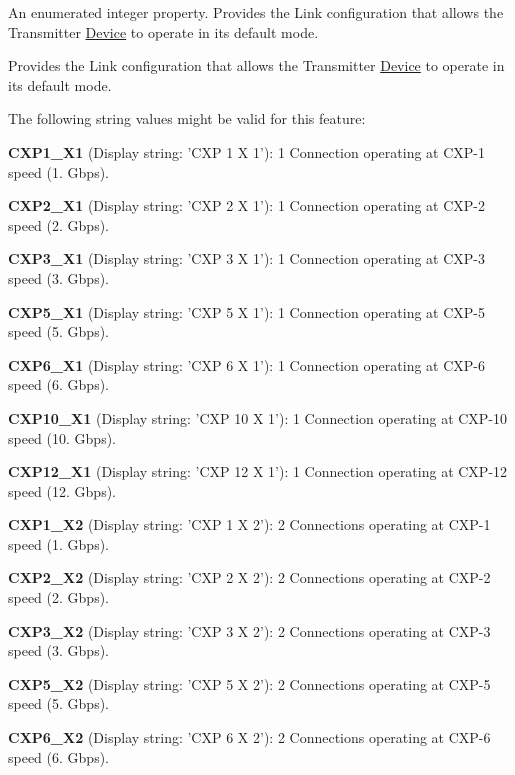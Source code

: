 An enumerated integer property. Provides the Link configuration that allows the Transmitter \hyperlink{classmv_i_m_p_a_c_t_1_1acquire_1_1_device}{Device} to operate in its default mode. 

Provides the Link configuration that allows the Transmitter \hyperlink{classmv_i_m_p_a_c_t_1_1acquire_1_1_device}{Device} to operate in its default mode.

The following string values might be valid for this feature\+:
\begin{DoxyItemize}
\item {\bfseries C\+X\+P1\+\_\+\+X1} (Display string\+: 'C\+X\+P 1 X 1')\+: 1 Connection operating at C\+X\+P-\/1 speed (1. Gbps).
\item {\bfseries C\+X\+P2\+\_\+\+X1} (Display string\+: 'C\+X\+P 2 X 1')\+: 1 Connection operating at C\+X\+P-\/2 speed (2. Gbps).
\item {\bfseries C\+X\+P3\+\_\+\+X1} (Display string\+: 'C\+X\+P 3 X 1')\+: 1 Connection operating at C\+X\+P-\/3 speed (3. Gbps).
\item {\bfseries C\+X\+P5\+\_\+\+X1} (Display string\+: 'C\+X\+P 5 X 1')\+: 1 Connection operating at C\+X\+P-\/5 speed (5. Gbps).
\item {\bfseries C\+X\+P6\+\_\+\+X1} (Display string\+: 'C\+X\+P 6 X 1')\+: 1 Connection operating at C\+X\+P-\/6 speed (6. Gbps).
\item {\bfseries C\+X\+P10\+\_\+\+X1} (Display string\+: 'C\+X\+P 10 X 1')\+: 1 Connection operating at C\+X\+P-\/10 speed (10. Gbps).
\item {\bfseries C\+X\+P12\+\_\+\+X1} (Display string\+: 'C\+X\+P 12 X 1')\+: 1 Connection operating at C\+X\+P-\/12 speed (12. Gbps).
\item {\bfseries C\+X\+P1\+\_\+\+X2} (Display string\+: 'C\+X\+P 1 X 2')\+: 2 Connections operating at C\+X\+P-\/1 speed (1. Gbps).
\item {\bfseries C\+X\+P2\+\_\+\+X2} (Display string\+: 'C\+X\+P 2 X 2')\+: 2 Connections operating at C\+X\+P-\/2 speed (2. Gbps).
\item {\bfseries C\+X\+P3\+\_\+\+X2} (Display string\+: 'C\+X\+P 3 X 2')\+: 2 Connections operating at C\+X\+P-\/3 speed (3. Gbps).
\item {\bfseries C\+X\+P5\+\_\+\+X2} (Display string\+: 'C\+X\+P 5 X 2')\+: 2 Connections operating at C\+X\+P-\/5 speed (5. Gbps).
\item {\bfseries C\+X\+P6\+\_\+\+X2} (Display string\+: 'C\+X\+P 6 X 2')\+: 2 Connections operating at C\+X\+P-\/6 speed (6. Gbps).

\end{DoxyItemize}
